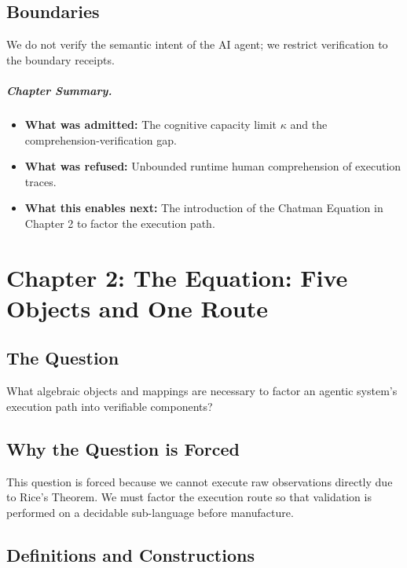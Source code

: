 \documentclass[11pt,oneside]{book}
\theoremstyle{definition}
\theoremstyle{plain}
\theoremstyle{remark}
\begin{document}
\section{Boundaries}
We do not verify the semantic intent of the AI agent; we restrict verification to the boundary receipts. %

\paragraph{Chapter Summary.}
\begin{itemize}
  \item \textbf{What was admitted:} The cognitive capacity limit $\kappa$ and the comprehension-verification gap. %
  \item \textbf{What was refused:} Unbounded runtime human comprehension of execution traces. %
  \item \textbf{What this enables next:} The introduction of the Chatman Equation in Chapter 2 to factor the execution path. %
\end{itemize}

\chapter{Chapter 2: The Equation: Five Objects and One Route}
\label{ch:equation}

\section{The Question}
What algebraic objects and mappings are necessary to factor an agentic system's execution path into verifiable components? %

\section{Why the Question is Forced}
This question is forced because we cannot execute raw observations directly due to Rice's Theorem. %
We must factor the execution route so that validation is performed on a decidable sub-language before manufacture. %

\section{Definitions and Constructions}
\end{document}
